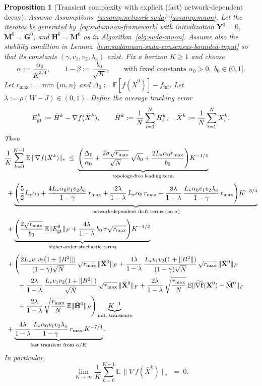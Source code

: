 \documentclass{article}
\newtheorem{proposition}{Proposition}
\begin{document}
\begin{proposition}[Transient complexity with explicit (fast) network-dependent decay]
\label{prop:sudamuon-final-convergence-K-1-4}
Assume Assumptions~\ref{assump:network-suda}--\ref{assump:muon}.
Let the iterates be generated by~\eqref{eq:sudamuon-framework} with initialization
$\mathbf Y^0=0$, $\mathbf M^0=\mathbf G^0$, and $\mathbf H^0=\mathbf M^0$ as in Algorithm~\ref{alg:suda-muon}.
Assume also the stability condition in Lemma~\ref{lem:sudamuon-suda-consensus-bounded-input} so that its constants $(\gamma,v_1,v_2,\lambda_a)$ exist.
Fix a horizon $K\ge 1$ and choose
\[
\alpha:=\frac{\alpha_0}{K^{3/4}},\qquad 1-\beta:=\frac{b_0}{\sqrt K},
\qquad \text{with fixed constants }\alpha_0>0,\; b_0\in(0,1].
\]
Let $r_{\max}:=\min\{m,n\}$ and $\Delta_0:=\mathbb{E}[f(\bar X^0)]-f_{\inf}$.
Let $\lambda:=\rho(W-J)\in(0,1)$.
Define the average tracking error
\[
E_{\rm gt}^k:=\bar H^k-\nabla f(\bar X^k),
\qquad \bar H^k:=\frac1N\sum_{i=1}^N H_i^k,\quad \bar X^k:=\frac1N\sum_{i=1}^N X_i^k.
\]
Then
{\small
\begin{equation}
\label{eq:sudamuon-final-rate-K-1-4-refined}
\begin{aligned}
&\frac{1}{K}\sum_{k=0}^{K-1}\mathbb{E}\,\|\nabla f(\bar X^k)\|_*
\;\le\;
\underbrace{\Bigg(
\frac{\Delta_0}{\alpha_0}
+\frac{2\sigma\sqrt{r_{\max}}}{\sqrt N}\,\sqrt{b_0}
+\frac{2L_*\alpha_0 r_{\max}}{b_0}
\Bigg)K^{-1/4}}_{\text{topology-free leading term}}
\\[0.25em]
&\;+\underbrace{\Bigg(
\frac{5}{2}L_*\alpha_0
+\frac{4L_*\alpha_0 v_1v_2\lambda_a}{1-\gamma}\,r_{\max}
+\frac{2\lambda}{1-\lambda}\,L_*\alpha_0\,r_{\max}
+\frac{8\lambda}{1-\lambda}\,\frac{L_*\alpha_0 v_1v_2\lambda_a}{1-\gamma}\,r_{\max}
\Bigg)K^{-3/4}}_{\text{network-dependent drift terms (no $\sigma$)}}
\\[0.25em]
&\;+\underbrace{\Bigg(
\frac{2\sqrt{r_{\max}}}{b_0}\,\mathbb{E}\|E_{\rm gt}^0\|_F
+\frac{4\lambda}{1-\lambda}\,b_0\,\sigma\sqrt{r_{\max}}
\Bigg)K^{-1/2}}_{\text{higher-order stochastic terms}}
\\[0.25em]
&\;+\Bigg(
\frac{2L_*v_1v_2(1+\|B^2\|)}{(1-\gamma)\sqrt N}\,\sqrt{r_{\max}}\,\|\tilde{\mathbf X}^0\|_F
+\frac{4\lambda}{1-\lambda}\,\frac{L_*v_1v_2(1+\|B^2\|)}{(1-\gamma)\sqrt N}\,\sqrt{r_{\max}}\,\|\tilde{\mathbf X}^0\|_F
\\
&\qquad+\frac{2\lambda}{1-\lambda}\,\frac{L_*v_1v_2(1+\|B^2\|)}{\sqrt N}\,\sqrt{r_{\max}}\,\|\tilde{\mathbf X}^0\|_F
+\frac{2\lambda}{1-\lambda}\,\sqrt{\frac{r_{\max}}{N}}\,\mathbb{E}\|\widetilde{\nabla \mathbf f}(\mathbf X^0)-\tilde{\mathbf M}^0\|_F
\\
&\qquad+\frac{2\lambda}{1-\lambda}\,\sqrt{\frac{r_{\max}}{N}}\,\mathbb{E}\|\tilde{\mathbf H}^0\|_F
\Bigg)\underbrace{K^{-1}}_{\text{init.\ transients}}
\\[0.25em]
&\;+\underbrace{\frac{4\lambda}{1-\lambda}\,\frac{L_*\alpha_0 v_1v_2\lambda_a}{1-\gamma}\,r_{\max}\,K^{-7/4}}_{\text{fast transient from }\alpha/K}.
\end{aligned}
\end{equation}
}
In particular,
\[
\lim_{K\to\infty}\frac{1}{K}\sum_{k=0}^{K-1}\mathbb{E}\,\|\nabla f(\bar X^k)\|_*\;=\;0.
\]
\end{proposition}
\end{document}

